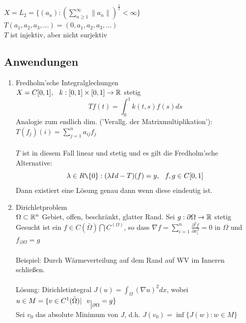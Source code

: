 \begin{beispiel}
$X = L_{2} = \{ (a_{n}): \left( \sum_{n \geq 1}^{\infty} \| a_{n} \| \right)^{\frac{1}{2}} < \infty \}$	\\
$T ( a_{1}, a_{2}, a_{3}, ...) = ( 0, a_{1}, a_{2}, a_{3}, ...)$ \\

$T$ ist injektiv, aber nicht surjektiv
\end{beispiel}

\subsection{Anwendungen}

\begin{enumerate}
	\item Fredholm'sche Integralglechungen \\
	$X = C[0, 1], \hspace{0.25cm} k: [0, 1] \times [0, 1] \rightarrow \mathbb{R}$ stetig \\
	\[ Tf(t) = \int_{0}^{1} k(t, s) f(s) ds \]
	Analogie zum endlich dim. ('Verallg. der Matrixmultiplikation'):  $ T(f_{j})(i) = \sum_{j = 1}^{n} a_{ij}f_{j}$ \\ \\
 	$T$ ist in diesem Fall linear und stetig und es gilt die Fredholm'sche Alternative:
	\[ \lambda \in R \verb|\| \{0\}: (\lambda Id - T)(f) = y, \hspace{0.25cm} f,g \in C[0, 1] \]
	Dann existiert eine Lösung genau dann wenn diese eindeutig ist. \\
	\item Dirichletproblem \\
	$\Omega \subset \mathbb{R}^n$ Gebiet, offen, beschränkt, glatter Rand. Sei $g: \partial \Omega \rightarrow \mathbb{R}$ stetig \\ 
	Gesucht ist ein $f \in C(\bar \Omega) \bigcap  C^(\Omega)$, so dass $\nabla f = \sum_{i = 1}^{n} \frac{\partial^{2} f}{\partial x_{i}^2} = 0$ in $\Omega$ und $f_{\big| \partial \Omega}= g$ \\ \\
	Beispiel: Durch Wärmeverteilung auf dem Rand auf WV im Inneren schlie{\ss}en. \\ \\
	Lösung: Dirichletintegral $J(u) = \int_{\Omega} (\nabla u )^{2} dx$, wobei $ u \in M = \{ v \in C^{1}(\bar \Omega) | \hspace{0.25cm} v_{\big| \partial \Omega} = g \}$ \\
	Sei $v_{0}$ das absolute Minimum von $J$, d.h. $J(v_{0}) = \inf \{ J(w): w \in M \}$ \\

\end{enumerate}
